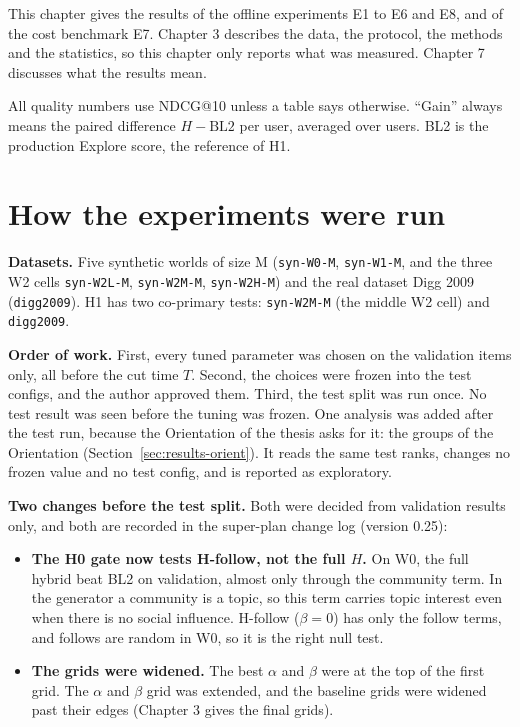 This chapter gives the results of the offline experiments E1 to E6 and E8, and of the cost benchmark E7. Chapter 3 describes the data, the protocol, the methods and the statistics, so this chapter only reports what was measured. Chapter 7 discusses what the results mean.

All quality numbers use NDCG@10 unless a table says otherwise. ``Gain'' always means the paired difference $H - \text{BL2}$ per user, averaged over users. BL2 is the production Explore score, the reference of H1.

\section{How the experiments were run}
\label{sec:results-setup}

\textbf{Datasets.} Five synthetic worlds of size M (\texttt{syn-W0-M}, \texttt{syn-W1-M}, and the three W2 cells \texttt{syn-W2L-M}, \texttt{syn-W2M-M}, \texttt{syn-W2H-M}) and the real dataset Digg 2009 (\texttt{digg2009}). H1 has two co-primary tests: \texttt{syn-W2M-M} (the middle W2 cell) and \texttt{digg2009}.

\textbf{Order of work.} First, every tuned parameter was chosen on the validation items only, all before the cut time $T$. Second, the choices were frozen into the test configs, and the author approved them. Third, the test split was run once. No test result was seen before the tuning was frozen. One analysis was added after the test run, because the Orientation of the thesis asks for it: the groups of the Orientation (Section~\ref{sec:results-orient}). It reads the same test ranks, changes no frozen value and no test config, and is reported as exploratory.

\textbf{Two changes before the test split.} Both were decided from validation results only, and both are recorded in the super-plan change log (version 0.25):
\begin{itemize}
  \item \textbf{The H0 gate now tests H-follow, not the full $H$.} On W0, the full hybrid beat BL2 on validation, almost only through the community term. In the generator a community is a topic, so this term carries topic interest even when there is no social influence. H-follow ($\beta = 0$) has only the follow terms, and follows are random in W0, so it is the right null test.
  \item \textbf{The grids were widened.} The best $\alpha$ and $\beta$ were at the top of the first grid. The $\alpha$ and $\beta$ grid was extended, and the baseline grids were widened past their edges (Chapter 3 gives the final grids).
\end{itemize}

